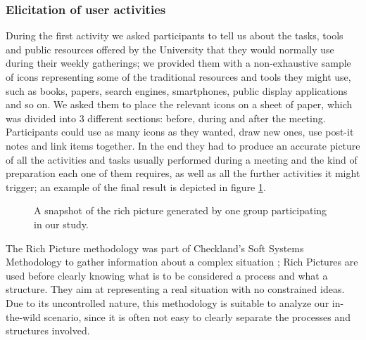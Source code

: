 \subsubsection{Elicitation of user activities}
During the first activity we asked participants to tell us about the tasks, tools and public resources offered by the University that they would normally use during their weekly gatherings; we provided them with a non-exhaustive sample of icons representing some of the traditional resources and tools they might use, such as books, papers, search engines, smartphones, public display applications and so on. We asked them to place the relevant icons on a sheet of paper, which was divided into 3 different sections: before, during and after the meeting. Participants could use as many icons as they wanted, draw new ones, use post-it notes and link items together. In the end they had to produce an accurate picture of all the activities and tasks usually performed during a meeting and the kind of preparation each one of them requires, as well as all the further activities it might trigger; an example of the final result is depicted in figure \ref{fig:rich}.

\begin{figure}[ht!]
\centering
{}
\caption{A snapshot of the rich picture generated by one group participating in our study.}\label{fig:rich}
\end{figure}

The Rich Picture methodology was part of Checkland's Soft Systems Methodology to gather information about a complex situation \cite{146910c69c07485e86a430ed52641409}; Rich Pictures are used before clearly knowing what is to be considered a process and what a structure. They aim at representing a real situation with no constrained ideas. Due to its uncontrolled nature, this methodology is suitable to analyze our in-the-wild scenario, since it is often not easy to clearly separate the processes and structures involved.

